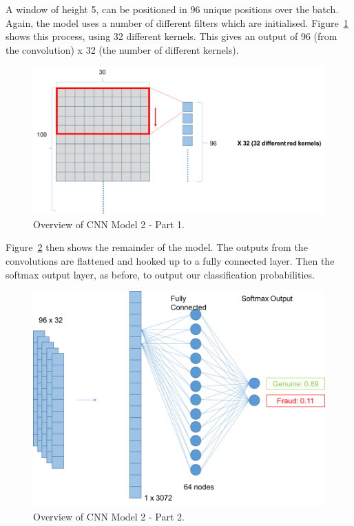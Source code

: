 \documentclass[12pt,a4paper,twoside]{report}
\begin{document}
A window of height 5, can be positioned in 96 unique positions over the batch. Again, the model uses a number of different filters which are initialised. Figure~\ref{fig:cnnv2-1} shows this process, using 32 different kernels. This gives an output of 96 (from the convolution) x 32 (the number of different kernels).

\begin{figure}[!htbp]
\centering
\includegraphics[scale=0.5]{cnnv2-1}
\caption{Overview of CNN Model 2 - Part 1.}
\label{fig:cnnv2-1}
\end{figure}


Figure~\ref{fig:cnnv2-2} then shows the remainder of the model. The outputs from the convolutions are flattened and hooked up to a fully connected layer. Then the softmax output layer, as before, to output our classification probabilities. 

\begin{figure}[!htbp]
\centering
\includegraphics[scale=0.6]{cnnv2-2}
\caption{Overview of CNN Model 2 - Part 2.}
\label{fig:cnnv2-2}
\end{figure}
\end{document}
